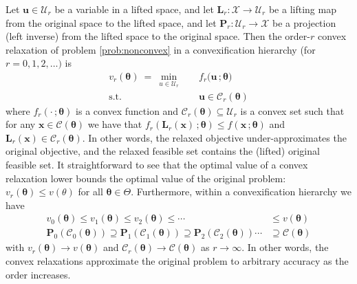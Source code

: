 \documentclass[10pt]{article} %
\theoremstyle{plain}
\theoremstyle{definition}
\theoremstyle{remark}
\begin{document}
Let $\mathbf{u} \in \mathcal{U}_r$ be a variable in a lifted space, and let $\bm{L}_r: \mathcal{X} \to \mathcal{U}_r$ be a lifting map from the original space to the lifted space, and let $\bm{P}_r: \mathcal{U}_r \to \mathcal{X}$ be a projection (left inverse) from the lifted space to the original space.
Then the order-$r$ convex relaxation of problem \cref{prob:nonconvex} in a convexification hierarchy (for $r = 0, 1, 2, \ldots)$ is
\begin{equation}
\label{prob:convex-relax}
\begin{aligned}
    v_r(\bm{\theta}) ~=~ \min_{u \in \mathcal{U}_r} \quad & f_r(\mathbf{u}\, ; \bm{\theta)} \\
    \text{s.t.} \quad & \mathbf{u}\in \mathcal{C}_r(\bm{\theta})
\end{aligned}
\end{equation}
where $f_r(\cdot \, ; \bm{\theta})$ is a convex function and $\mathcal{C}_r(\bm{\theta}) \subseteq \mathcal{U}_r$ is a convex set such that
for any $\mathbf{x} \in \mathcal{C}(\bm{\theta})$ we have that
$f_r(\bm{L}_r(\bm{x})\, ; \bm{\theta}) \leq f(\mathbf{x}\, ; \bm{\theta})$ 
and 
$\bm{L}_r(\mathbf{x}) \in \mathcal{C}_r(\bm{\theta})$.
In other words, the relaxed objective under-approximates the original objective, and the relaxed feasible set contains the (lifted) original feasible set.
It straightforward to see that the optimal value of a convex relaxation lower bounds the optimal value of the original problem: $v_r(\bm{\theta}) \leq v(\theta)$ for all $\bm{\theta} \in \Theta$.
Furthermore, within a convexification hierarchy we have
\begin{align*}
    v_0(\bm{\theta}) \leq v_1(\bm{\theta}) \leq v_2(\bm{\theta}) \leq \cdots &\leq v(\bm{\theta})\\[4pt]
    \bm{P}_0(\mathcal{C}_0(\bm{\theta})) \supseteq \bm{P}_1(\mathcal{C}_1(\bm{\theta})) \supseteq \bm{P}_2(\mathcal{C}_2(\bm{\theta})) \cdots &\supseteq \mathcal{C}(\bm{\theta})
\end{align*}
with $v_r(\bm{\theta}) \to v(\bm{\theta})$ and $\mathcal{C}_r(\bm{\theta}) \to \mathcal{C}(\bm{\theta})$ as $r \to \infty$. In other words, the convex relaxations approximate the original problem to arbitrary accuracy as the order increases.
\end{document}

